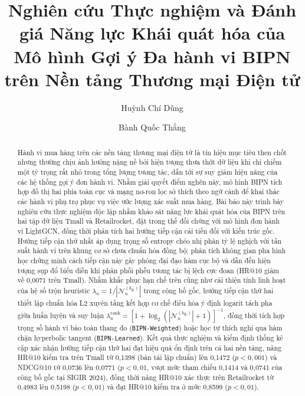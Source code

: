 \documentclass{llncs}
\begin{document}

\title{Nghiên cứu Thực nghiệm và Đánh giá Năng lực Khái quát hóa của Mô hình Gợi ý Đa hành vi BIPN trên Nền tảng Thương mại Điện tử}

\author{Huỳnh Chí Dũng \and Bành Quốc Thắng}


\maketitle

\begin{abstract}
Hành vi mua hàng trên các nền tảng thương mại điện tử là tín hiệu mục tiêu then chốt nhưng thường chịu ảnh hưởng nặng nề bởi hiện tượng thưa thớt dữ liệu khi chỉ chiếm một tỷ trọng rất nhỏ trong tổng lượng tương tác, dẫn tới sự suy giảm hiệu năng của các hệ thống gợi ý đơn hành vi. Nhằm giải quyết điểm nghẽn này, mô hình BIPN tích hợp đồ thị hai phía toàn cục và mạng nơ-ron lọc sở thích theo ngữ cảnh để khai thác các hành vi phụ trợ phục vụ việc ước lượng xác suất mua hàng. Bài báo này trình bày nghiên cứu thực nghiệm độc lập nhằm khảo sát năng lực khái quát hóa của BIPN trên hai tập dữ liệu Tmall và Retailrocket, đặt trong thế đối chứng với mô hình đơn hành vi LightGCN, đồng thời phân tích hai hướng tiếp cận cải tiến đối với kiến trúc gốc. Hướng tiếp cận thứ nhất áp dụng trọng số entropy chéo nhị phân tỷ lệ nghịch với tần suất hành vi trên khung cơ sở chưa chuẩn hóa đồng bộ; phân tích không gian pha hình học chứng minh cách tiếp cận này gây phóng đại đạo hàm cục bộ và dẫn đến hiện tượng sụp đổ biểu diễn khi phân phối phễu tương tác bị lệch cực đoan (HR@10 giảm về 0{,}0071 trên Tmall). Nhằm khắc phục hạn chế trên cũng như cải thiện tính linh hoạt của hệ số trộn heuristic $\lambda_u = 1/|\mathcal{N}_u^{(b_K)}|$ trong công bố gốc, hướng tiếp cận thứ hai thiết lập chuẩn hóa L2 xuyên tầng kết hợp cơ chế điều hòa ý định logarit tách pha giữa huấn luyện và suy luận $\lambda_u^{\mathrm{rank}} = [1 + \log_2(|\mathcal{N}_u^{(b_K)}| + 1)]^{-1}$, đồng thời tích hợp trọng số hành vi bảo toàn thang đo (\texttt{BIPN-Weighted}) hoặc học tự thích nghi qua hàm chặn hyperbolic tangent (\texttt{BIPN-Learned}). Kết quả thực nghiệm và kiểm định thống kê cặp xác nhận hướng tiếp cận thứ hai đạt hiệu quả ổn định trên cả hai nền tảng, nâng HR@10 kiểm tra trên Tmall từ 0{,}1398 (bản tái lập chuẩn) lên 0{,}1472 ($p < 0{,}001$) và NDCG@10 từ 0{,}0736 lên 0{,}0771 ($p < 0{,}01$, vượt mức tham chiếu 0{,}1414 và 0{,}0741 của công bố gốc tại SIGIR 2024), đồng thời nâng HR@10 xác thực trên Retailrocket từ 0{,}4983 lên 0{,}5198 ($p < 0{,}01$) và đạt HR@10 kiểm tra ở mức 0{,}8599 ($p < 0{,}01$).
\end{abstract}
\end{document}

